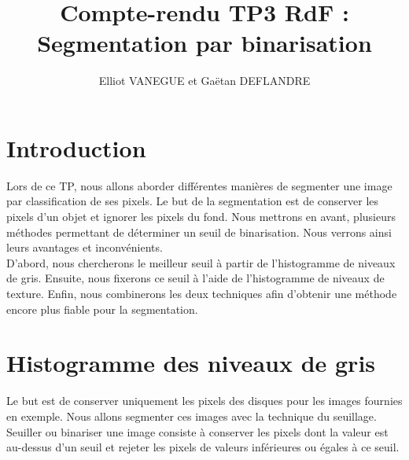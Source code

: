 \documentclass[11pt]{article}
\title{Compte-rendu TP3 RdF : Segmentation par binarisation}
\author{Elliot VANEGUE et Gaëtan DEFLANDRE}
\begin{document}


  \maketitle
  
  \mbox{}
  \newpage
  \clearpage
  
  \section*{Introduction}
  Lors de ce TP, nous allons aborder différentes manières de segmenter une image par 
  classification de ses pixels. Le but de la segmentation est de  conserver les pixels d'un 
  objet et ignorer les pixels du fond. Nous mettrons en avant, plusieurs méthodes permettant 
  de déterminer un seuil de binarisation. Nous verrons ainsi leurs avantages et inconvénients.\\
  
  D'abord, nous chercherons le meilleur seuil à partir de l'histogramme de niveaux de gris.
  Ensuite, nous fixerons ce seuil à l'aide de l'histogramme de niveaux de texture.
  Enfin, nous combinerons les deux techniques afin d'obtenir une méthode encore plus 
  fiable pour la segmentation.\\
  
  
  \section{Histogramme des niveaux de gris}
  Le but est de conserver uniquement les pixels des disques pour les images fournies en exemple. 
  Nous allons segmenter ces images avec la technique du seuillage. Seuiller ou binariser une image consiste à conserver les pixels dont
  la valeur est au-dessus d'un seuil et rejeter les pixels de valeurs inférieures ou égales à ce seuil.\\
  
\end{document}
